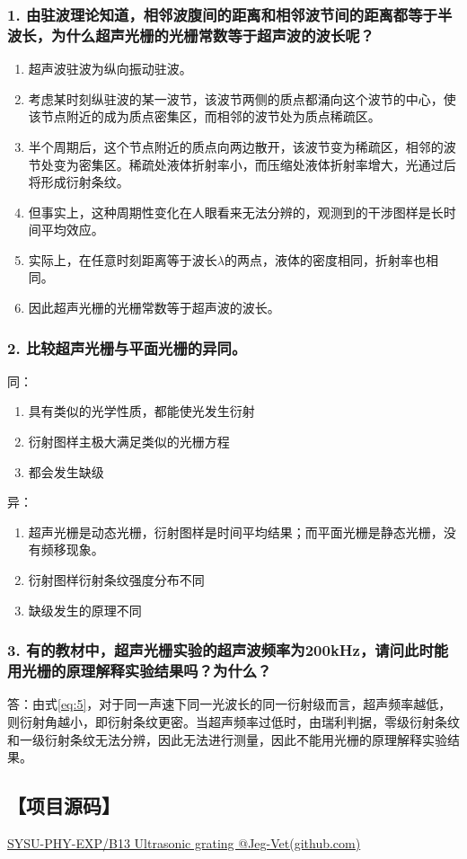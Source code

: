 \documentclass[12pt,a4paper,UTF8]{ctexart}
\begin{document}
	\subsubsection*{1. 由驻波理论知道，相邻波腹间的距离和相邻波节间的距离都等于半波长，为什么超声光栅的光栅常数等于超声波的波长呢？}
		\begin{enumerate}[label=\arabic*.]
			\item 超声波驻波为纵向振动驻波。
			\item 考虑某时刻纵驻波的某一波节，该波节两侧的质点都涌向这个波节的中心，使该节点附近的成为质点密集区，而相邻的波节处为质点稀疏区。
			\item 半个周期后，这个节点附近的质点向两边散开，该波节变为稀疏区，相邻的波节处变为密集区。稀疏处液体折射率小，而压缩处液体折射率增大，光通过后将形成衍射条纹。
			\item 但事实上，这种周期性变化在人眼看来无法分辨的，观测到的干涉图样是长时间平均效应。
			\item 实际上，在任意时刻距离等于波长$\lambda$的两点，液体的密度相同，折射率也相同。
			\item 因此超声光栅的光栅常数等于超声波的波长。
		\end{enumerate}
	\subsubsection*{2. 比较超声光栅与平面光栅的异同。}
		同：
		\begin{enumerate}[label=\arabic*.]
			\item 具有类似的光学性质，都能使光发生衍射
			\item 衍射图样主极大满足类似的光栅方程
			\item 都会发生缺级
		\end{enumerate}
		
		异：
		\begin{enumerate}[label=\arabic*.]
			\item 超声光栅是动态光栅，衍射图样是时间平均结果；而平面光栅是静态光栅，没有频移现象。
			\item 衍射图样衍射条纹强度分布不同
			\item 缺级发生的原理不同
		\end{enumerate}
	\subsubsection*{3. 有的教材中，超声光栅实验的超声波频率为200kHz，请问此时能用光栅的原理解释实验结果吗？为什么？}
		答：由式\ref{eq:5}，对于同一声速下同一光波长的同一衍射级而言，超声频率越低，则衍射角越小，即衍射条纹更密。当超声频率过低时，由瑞利判据，零级衍射条纹和一级衍射条纹无法分辨，因此无法进行测量，因此不能用光栅的原理解释实验结果。

\subsection*{【项目源码】}
\href{https://github.com/Jeg-Vet/SYSU-PHY-EXP/tree/main/B13-Ultrasonic_grating}{SYSU-PHY-EXP/B13 Ultrasonic grating @Jeg-Vet(github.com)}
		
\end{document}

